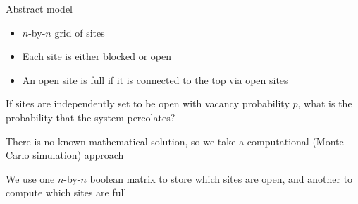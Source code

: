 \documentclass[8pt,a4paper,compress]{beamer}
\begin{document}
\begin{frame}[fragile]
\pause

Abstract model
\begin{itemize}
\pause
\item $n$-by-$n$ grid of sites
\pause
\item Each site is either blocked or open
\pause
\item An open site is full if it is connected to the top via open sites
\end{itemize}

\begin{center}
\end{center}

\pause
\bigskip

If sites are independently set to be open with vacancy probability $p$, what is the probability that the system percolates?

\pause
\bigskip

There is no known mathematical solution, so we take a computational (Monte Carlo simulation) approach

\pause
\bigskip

We use one $n$-by-$n$ boolean matrix to store which sites are open, and another to compute which sites are full
\end{frame}
\end{document}
